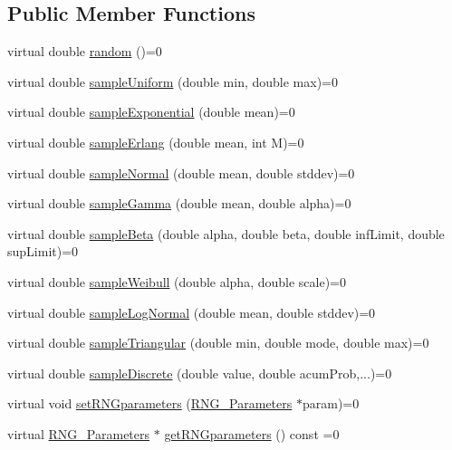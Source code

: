 \subsection*{Public Member Functions}
\begin{DoxyCompactItemize}
\item 
virtual double \hyperlink{class_sampler__if_a8136ccd467ee5621813269fa23791423}{random} ()=0
\item 
virtual double \hyperlink{class_sampler__if_a0643f4ca1d770d01afefa956e9f78edf}{sample\-Uniform} (double min, double max)=0
\item 
virtual double \hyperlink{class_sampler__if_aeb17b9d84bc05c14f0be2ce0b60ed263}{sample\-Exponential} (double mean)=0
\item 
virtual double \hyperlink{class_sampler__if_acd16e61c373f5e051c5f4103848e5c8a}{sample\-Erlang} (double mean, int M)=0
\item 
virtual double \hyperlink{class_sampler__if_a559f1f29b5e4455c9e59cf00d622da47}{sample\-Normal} (double mean, double stddev)=0
\item 
virtual double \hyperlink{class_sampler__if_aafcceb6ad73790ddca45af1ea7f2088d}{sample\-Gamma} (double mean, double alpha)=0
\item 
virtual double \hyperlink{class_sampler__if_a1081daf677b12de42f0abfcbe5ba9301}{sample\-Beta} (double alpha, double beta, double inf\-Limit, double sup\-Limit)=0
\item 
virtual double \hyperlink{class_sampler__if_ac02b82a18e78c4bbaea1bc90c617857b}{sample\-Weibull} (double alpha, double scale)=0
\item 
virtual double \hyperlink{class_sampler__if_a031e1170c529e2cc67131d4da6ee683e}{sample\-Log\-Normal} (double mean, double stddev)=0
\item 
virtual double \hyperlink{class_sampler__if_a02d68c26089c6dd53b99882da79c88ca}{sample\-Triangular} (double min, double mode, double max)=0
\item 
virtual double \hyperlink{class_sampler__if_a2fcdf79225b5cdd023db7751655f1ceb}{sample\-Discrete} (double value, double acum\-Prob,...)=0
\item 
virtual void \hyperlink{class_sampler__if_a630a0cbbef6e49869063530b03d3bb35}{set\-R\-N\-Gparameters} (\hyperlink{class_sampler__if_1_1_r_n_g___parameters}{R\-N\-G\-\_\-\-Parameters} $\ast$param)=0
\item 
virtual \hyperlink{class_sampler__if_1_1_r_n_g___parameters}{R\-N\-G\-\_\-\-Parameters} $\ast$ \hyperlink{class_sampler__if_adb21edf9170ad5d9b27f4788db74bafa}{get\-R\-N\-Gparameters} () const =0
\end{DoxyCompactItemize}


